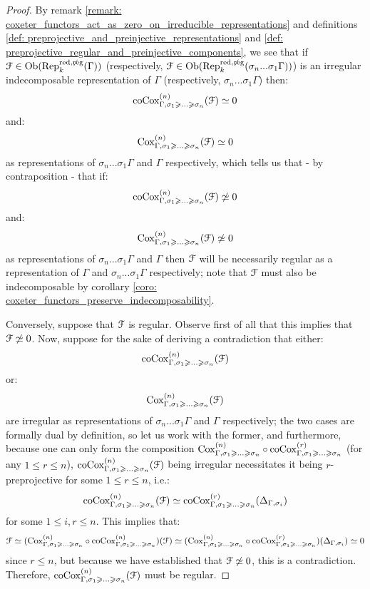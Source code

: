                 \begin{proof}
                    By remark \ref{remark: coxeter_functors_act_as_zero_on_irreducible_representations} and definitions \ref{def: preprojective_and_preinjective_representations} and \ref{def: preprojective_regular_and_preinjective_components}, we see that if $\mathcal{F} \in \mathrm{Ob}(\mathrm{Rep}_k^{\mathrm{red}, \not \mathrm{reg}}(\Gamma))$ (respectively, $\mathcal{F} \in \mathrm{Ob}(\mathrm{Rep}_k^{\mathrm{red}, \not \mathrm{reg}}(\sigma_n ... \sigma_1 \Gamma))$) is an irregular indecomposable representation of $\Gamma$ (respectively, $\sigma_n ... \sigma_1 \Gamma$) then:
                        $$\mathrm{co}\mathrm{Cox}_{\Gamma, \sigma_1 \geqslant ...\geqslant \sigma_n}^{(n)}(\mathcal{F}) \simeq 0$$
                    and:
                        $$\mathrm{Cox}_{\Gamma, \sigma_1 \geqslant ...\geqslant \sigma_n}^{(n)}(\mathcal{F}) \simeq 0$$
                    as representations of $\sigma_n ... \sigma_1 \Gamma$ and $\Gamma$ respectively, which tells us that - by contraposition - that if:
                        $$\mathrm{co}\mathrm{Cox}_{\Gamma, \sigma_1 \geqslant ...\geqslant \sigma_n}^{(n)}(\mathcal{F}) \not \simeq 0$$
                    and:
                        $$\mathrm{Cox}_{\Gamma, \sigma_1 \geqslant ...\geqslant \sigma_n}^{(n)}(\mathcal{F}) \not \simeq 0$$
                    as representations of $\sigma_n ... \sigma_1 \Gamma$ and $\Gamma$ then $\mathcal{F}$ will be necessarily regular as a representation of $\Gamma$ and $\sigma_n ... \sigma_1 \Gamma$ respectively; note that $\mathcal{F}$ must also be indecomposable by corollary \ref{coro: coxeter_functors_preserve_indecomposability}.
                    
                    Conversely, suppose that $\mathcal{F}$ is regular. Observe first of all that this implies that $\mathcal{F} \not \simeq 0$. Now, suppose for the sake of deriving a contradiction that either:
                        $$\mathrm{co}\mathrm{Cox}_{\Gamma, \sigma_1 \geqslant ...\geqslant \sigma_n}^{(n)}(\mathcal{F})$$
                    or:
                        $$\mathrm{Cox}_{\Gamma, \sigma_1 \geqslant ...\geqslant \sigma_n}^{(n)}(\mathcal{F})$$
                    are irregular as representations of $\sigma_n ... \sigma_1 \Gamma$ and $\Gamma$ respectively; the two cases are formally dual by definition, so let us work with the former, and furthermore, because one can only form the composition $\mathrm{Cox}_{\Gamma, \sigma_1 \geqslant ...\geqslant \sigma_n}^{(n)} \circ \mathrm{co}\mathrm{Cox}_{\Gamma, \sigma_1 \geqslant ...\geqslant \sigma_n}^{(r)}$ (for any $1 \leq r \leq n$), $\mathrm{co}\mathrm{Cox}_{\Gamma, \sigma_1 \geqslant ...\geqslant \sigma_n}^{(n)}(\mathcal{F})$ being irregular necessitates it being $r$-preprojective for some $1 \leq r \leq n$, i.e.:
                        $$\mathrm{co}\mathrm{Cox}_{\Gamma, \sigma_1 \geqslant ...\geqslant \sigma_n}^{(n)}(\mathcal{F}) \simeq \mathrm{co}\mathrm{Cox}_{\Gamma, \sigma_1 \geqslant ...\geqslant \sigma_n}^{(r)}(\Delta_{\Gamma, \sigma_i})$$
                    for some $1 \leq i, r \leq n$. This implies that:
                        $$\mathcal{F} \simeq (\mathrm{Cox}_{\Gamma, \sigma_1 \geqslant ...\geqslant \sigma_n}^{(n)} \circ \mathrm{co}\mathrm{Cox}_{\Gamma, \sigma_1 \geqslant ...\geqslant \sigma_n}^{(n)})(\mathcal{F}) \simeq (\mathrm{Cox}_{\Gamma, \sigma_1 \geqslant ...\geqslant \sigma_n}^{(n)} \circ \mathrm{co}\mathrm{Cox}_{\Gamma, \sigma_1 \geqslant ...\geqslant \sigma_n}^{(r)})(\Delta_{\Gamma, \sigma_i}) \simeq 0$$
                    since $r \leq n$, but because we have established that $\mathcal{F} \not \simeq 0$, this is a contradiction. Therefore, $\mathrm{co}\mathrm{Cox}_{\Gamma, \sigma_1 \geqslant ...\geqslant \sigma_n}^{(n)}(\mathcal{F})$ must be regular. 
                \end{proof}
